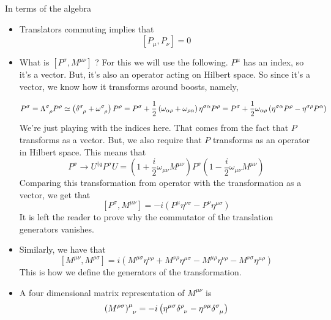 \documentclass[11pt, oneside]{article}   	%
\theoremstyle{slanted}
\begin{document}
In terms of the algebra
\begin{itemize}
\item  Translators commuting implies that 
	\[
	 \left[ P _ \mu , P _ \nu  \right]  = 0
	\]  
\item What is $ \left[  P ^ \sigma , M ^{ \mu \nu }  \right]  $ ? 
	For this we will use the following. 
	$ P  ^ \mu $ has an index, so it's a vector. 
	But, it's also an operator acting on 
	Hilbert space. So since it's a vector, 
	we know how it transforms around boosts, namely, 

	\[
	 P ^ \sigma = \Lambda \indices{ ^ \sigma _ \rho } P ^ \rho  
	 \simeq \left( \delta \indices{ ^ \sigma _ \rho } + 
	 \omega \indices{ ^ \sigma _ \rho }  \right)  P ^ \rho  = 
	 P ^ \sigma + \frac{1}{ 2 } \left( \omega _{ 
	 \alpha \rho } + \omega _{ \rho \alpha }  \right)  \eta ^{ \sigma \alpha } 
	 P ^{ \rho }  = 
	 P ^{ \sigma } + \frac{1}{2 } \omega _{ \alpha \rho } 
	 \left( \eta ^{ \sigma \alpha } P ^ \rho  - \eta ^{ \sigma \rho } P ^ \alpha  \right) 
	\]  We're just playing with 
	the indices here. That comes from the fact that 
	$ P $ transforms as a vector. 
	But, we also require that $ P $ transforms as an operator
	in Hilbert space. This means that 
	\[
	 P ^ \sigma \to U^{ \dagger q} P ^ \sigma U  = 
	 \left( 1  + \frac{i}{2 } \omega _{ \mu \nu } M ^{ \mu \nu  }  \right)  
	 P ^ \sigma \left(  1 - \frac{i}{2 } \omega _{ \mu \nu } M ^{ \mu \nu }  \right) 
	\] Comparing 
	this transformation from operator 
	with the transformation as a vector, 
	we get that 
	\[
	 \left[  P ^ \sigma , M ^{ \mu \nu }  \right]   = 
	  -i \left( P ^ \mu \eta ^{ \nu \sigma }  - P ^ \nu \eta ^{ \mu \sigma } \right) 
	\] It is left the reader to prove why the commutator
	of the translation generators vanishes. 
\item Similarly, we have that 
	\[
	 \left[  M ^{ \mu \nu } , M ^{ \rho \sigma }  \right]   = 
	 i \left( M ^{ \mu \sigma } \eta ^{ \nu \rho } + 
	 M ^{ \nu \rho } \eta ^{ \mu \sigma } - 
 M ^{ \mu \rho } \eta ^{ \nu \rho }  - M ^{ \nu \sigma } \eta ^{ \mu \rho } \right)  
	\] This is how we define 
	the generators of the transformation. 
\item A four dimensional matrix representation of $ M ^{ \mu \nu } $ 
	is 
	\[
	 \left( M^{ \rho \sigma }   \right)\indices{ ^ \mu _ \nu } 
	  = - i \left( \eta ^{ \mu \sigma } \delta \indices{ ^ \rho _ \nu } 
	   - \eta ^{ \rho \mu } \delta \indices{ ^ \sigma _ \mu }  \right) 
	\] 
\end{itemize}
\end{document}
